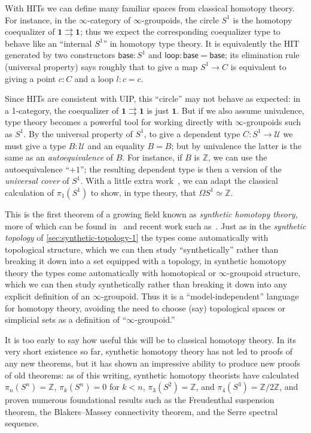 \documentclass[12pt]{article}
\def\oo{\ensuremath{\infty}}
\def\Z{\mathbb{Z}}
\def\U{\mathscr{U}}
\def\hocirc{S^1}
\def\unit{\mathbf{1}}
\def\base{\mathsf{base}}
\def\lloop{\mathsf{loop}}
\numberwithin{equation}{section}
\begin{document}
With HITs we can define many familiar spaces from classical homotopy theory.
For instance, in the $\oo$-category of $\oo$-groupoids, the circle $\hocirc$ is the homotopy coequalizer of $\unit \rightrightarrows \unit$; thus we expect the corresponding coequalizer type to behave like an ``internal $\hocirc$'' in homotopy type theory.
It is equivalently the HIT generated by two constructors $\base:\hocirc$ and $\lloop :\base=\base$; its elimination rule (universal property) says roughly that to give a map $\hocirc \to C$ is equivalent to giving a point $c:C$ and a loop $l:c=c$.

Since HITs are consistent with UIP, this ``circle'' may not behave as expected: in a 1-category, the coequalizer of $\unit \rightrightarrows \unit$ is just $\unit$.
But if we also assume univalence, type theory becomes a powerful tool for working directly with $\oo$-groupoids such as $\hocirc$.
By the universal property of $\hocirc$, to give a dependent type $C:\hocirc \to \U$ we must give a type $B:\U$ and an equality $B=B$; but by univalence the latter is the same as an \emph{autoequivalence} of $B$.
For instance, if $B$ is $\Z$, we can use the autoequivalence ``$+1$''; the resulting dependent type is then a version of the \emph{universal cover} of $\hocirc$.
With a little extra work~\cite{ls:pi1s1}, we can adapt the classical calculation of $\pi_1(\hocirc)$ to show, in type theory, that $\Omega \hocirc \simeq \Z$.

This is the first theorem of a growing field known as \emph{synthetic homotopy theory}, more of which can be found in~\cite[Chapter 8]{hottbook} and recent work such as~\cite{lf:emspaces,ffll:blakers-massey,brunerie:thesis}.
Just as in the \emph{synthetic topology} of \cref{sec:synthetic-topology-1} the types come automatically with topological structure, which we can then study ``synthetically'' rather than breaking it down into a set equipped with a topology, in synthetic homotopy theory the types come automatically with homotopical or $\oo$-groupoid structure, which we can then study synthetically rather than breaking it down into any explicit definition of an $\oo$-groupoid.
Thus it is a ``model-independent'' language for homotopy theory, avoiding the need to choose (say) topological spaces or simplicial sets as a definition of ``$\oo$-groupoid.''

It is too early to say how useful this will be to classical homotopy theory.
In its very short existence so far, synthetic homotopy theory has not led to proofs of any new theorems, but it has shown an impressive ability to produce new proofs of old theorems:
as of this writing, synthetic homotopy theorists have calculated $\pi_n(S^n)=\Z$, $\pi_k(S^n)=0$ for $k<n$, $\pi_3(S^2)=\Z$, and $\pi_4(S^3)=\Z/2\Z$, and proven numerous foundational results such as the Freudenthal suspension theorem, the Blakers--Massey connectivity theorem, and the Serre spectral sequence.
\end{document}
